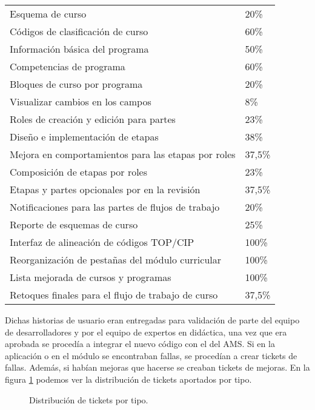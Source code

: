 \begin{table}[H]
\begin{tabular}{@{}ll@{}}
Esquema de curso                                    &  20\%  \\
Códigos de clasificación de curso                   &  60\%  \\
Información básica del programa                     &  50\%  \\
Competencias de programa                            &  60\%  \\
Bloques de curso por programa                       &  20\%  \\
Visualizar cambios en los campos                    &   8\%  \\
Roles de creación y edición para partes             &  23\%  \\
Diseño e implementación de etapas                   &  38\%  \\
Mejora en comportamientos para las etapas por roles & 37,5\% \\
Composición de etapas por roles                     &  23\%  \\
Etapas y partes opcionales por en la revisión       & 37,5\% \\
Notificaciones para las partes de flujos de trabajo &  20\%  \\
Reporte de esquemas de curso                        &  25\%  \\
Interfaz de alineación de códigos TOP/CIP           & 100\%  \\
Reorganización de pestañas del módulo curricular    & 100\%  \\
Lista mejorada de cursos y programas                & 100\%  \\
Retoques finales para el flujo de trabajo de curso  & 37,5\% \\ \bottomrule
\end{tabular}
\end{table}

Dichas historias de usuario eran entregadas para validación de parte del equipo de desarrolladores y por el equipo de expertos en didáctica, una vez que era aprobada se procedía a integrar el nuevo código con el del AMS. Si en la aplicación o en el módulo se encontraban fallas, se procedían a crear tickets de fallas. Además, si habían mejoras que hacerse se creaban tickets de mejoras. En la figura \ref{tickets_by_type} podemos ver la distribución de tickets aportados por tipo.

\begin{figure}[H]
\centering
{}
\caption{Distribución de tickets por tipo.}
  \label{tickets_by_type}
\end{figure}

